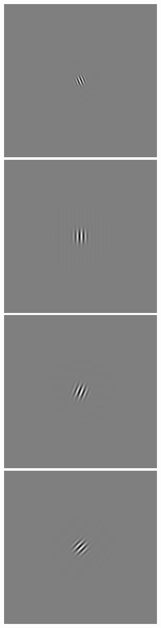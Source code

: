 \begin{figure}
\begin{center}
 \includegraphics[scale=0.1]{ch4/figures/iGabor0_7.jpg}\\
 \includegraphics[scale=0.1]{ch4/figures/iGabor1_0.jpg}
 \includegraphics[scale=0.1]{ch4/figures/iGabor1_1.jpg}
 \includegraphics[scale=0.1]{ch4/figures/iGabor1_2.jpg}

\end{center}
\end{figure}
